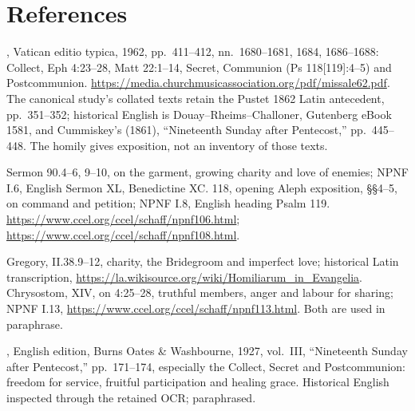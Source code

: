 \section{References}
\begin{description}[style=nextline,leftmargin=0pt,labelsep=0pt,itemsep=.35em]
\item[Appointed Scripture and prayers]
, Vatican editio typica, 1962, pp.~411--412,
nn.~1680--1681, 1684, 1686--1688: Collect, Eph 4:23--28,
Matt 22:1--14, Secret, Communion (Ps 118[119]:4--5) and
Postcommunion. \url{https://media.churchmusicassociation.org/pdf/missale62.pdf}.
The canonical study's collated texts retain the Pustet 1862 Latin
antecedent, pp.~351--352; historical English is Douay--Rheims--Challoner,
Gutenberg eBook 1581, and Cummiskey's  (1861),
``Nineteenth Sunday after Pentecost,'' pp.~445--448.
The homily gives exposition, not an inventory of those texts.

\item[Augustine]
Sermon 90.4--6, 9--10, on the garment, growing charity and love of
enemies; NPNF I.6, English Sermon XL, Benedictine XC.
 118, opening Aleph exposition,
\S\S4--5, on command and petition; NPNF I.8, English heading Psalm 119.
\url{https://www.ccel.org/ccel/schaff/npnf106.html};
\url{https://www.ccel.org/ccel/schaff/npnf108.html}.

\item[Gregory the Great and John Chrysostom]
Gregory,  II.38.9--12, charity,
the Bridegroom and imperfect love; historical Latin transcription,
\url{https://la.wikisource.org/wiki/Homiliarum_in_Evangelia}.
Chrysostom,  XIV, on 4:25--28,
truthful members, anger and labour for sharing; NPNF I.13,
\url{https://www.ccel.org/ccel/schaff/npnf113.html}.
Both are used in paraphrase.

\item[Blessed Ildefonso Schuster]
, English edition, Burns Oates \& Washbourne,
1927, vol.~III, ``Nineteenth Sunday after Pentecost,''
pp.~171--174, especially the Collect, Secret and Postcommunion:
freedom for service, fruitful participation and healing grace.
Historical English inspected through the retained OCR; paraphrased.
\end{description}
